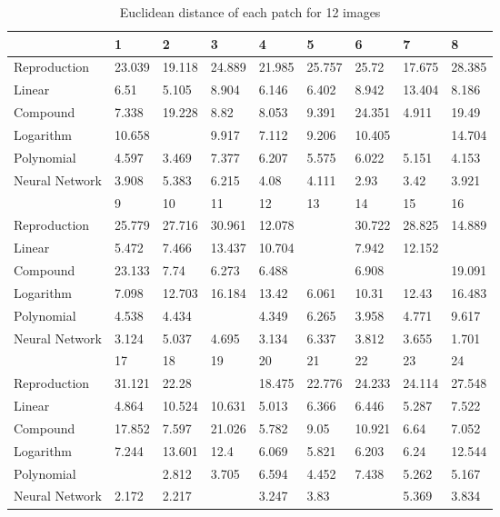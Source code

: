 \begin{table}[H]
  \begin{center}
  \resizebox{10cm}{!} {
    \begin{tabular}{|l |l |l |l |l |l |l |l |l |}\hline
          &1 &2 &3 &4 &5 &6 &7 &8\\ \hline 
        Reproduction &23.039 &19.118 &24.889 &21.985 &25.757 &25.72 &17.675 &28.385\\ 
        Linear &6.51 &5.105 &8.904 &6.146 &6.402 &8.942 &13.404 &8.186\\ 
        Compound &7.338 &19.228 &8.82 &8.053 &9.391 &24.351 &4.911 &19.49\\ 
        Logarithm &10.658 &\cellcolor{colorgreen}{3.084} &9.917 &7.112 &9.206 &10.405 &\cellcolor{colorred}{18.933} &14.704\\ 
        Polynomial &4.597 &3.469 &7.377 &6.207 &5.575 &6.022 &5.151 &4.153\\ 
        Neural Network &3.908 &5.383 &6.215 &4.08 &4.111 &2.93 &3.42 &3.921\\ \hline 
          &9 &10 &11 &12 &13 &14 &15 &16\\ \hline 
        Reproduction &25.779 &27.716 &30.961 &12.078 &\cellcolor{colorred}{31.537} &30.722 &28.825 &14.889\\ 
        Linear &5.472 &7.466 &13.437 &10.704 &\cellcolor{colorgreen}{4.744} &7.942 &12.152 &\cellcolor{colorred}{15.425}\\ 
        Compound &23.133 &7.74 &6.273 &6.488 &\cellcolor{colorgreen}{4.607} &6.908 &\cellcolor{colorred}{29.981} &19.091\\ 
        Logarithm &7.098 &12.703 &16.184 &13.42 &6.061 &10.31 &12.43 &16.483\\ 
        Polynomial &4.538 &4.434 &\cellcolor{colorred}{12.564} &4.349 &6.265 &3.958 &4.771 &9.617\\ 
        Neural Network &3.124 &5.037 &4.695 &3.134 &6.337 &3.812 &3.655 &1.701\\ \hline 
          &17 &18 &19 &20 &21 &22 &23 &24\\ \hline 
        Reproduction &31.121 &22.28 &\cellcolor{colorgreen}{5.415} &18.475 &22.776 &24.233 &24.114 &27.548\\ 
        Linear &4.864 &10.524 &10.631 &5.013 &6.366 &6.446 &5.287 &7.522\\ 
        Compound &17.852 &7.597 &21.026 &5.782 &9.05 &10.921 &6.64 &7.052\\ 
        Logarithm &7.244 &13.601 &12.4 &6.069 &5.821 &6.203 &6.24 &12.544\\ 
        Polynomial &\cellcolor{colorgreen}{2.576} &2.812 &3.705 &6.594 &4.452 &7.438 &5.262 &5.167\\ 
        Neural Network &2.172 &2.217 &\cellcolor{colorgreen}{1.098} &3.247 &3.83 &\cellcolor{colorred}{6.565} &5.369 &3.834\\ \hline 
    \end{tabular}
  }
  \caption{Euclidean distance of each patch for 12 images }
  \end{center}
\end{table}
